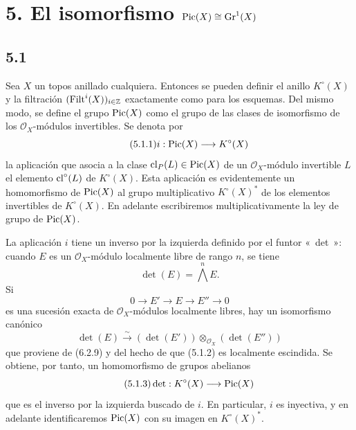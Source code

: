 
\section*{5. El isomorfismo \(\operatorname{Pic}(X)\cong\operatorname{Gr}^1(X)\)}

\subsection*{5.1}
Sea \(X\) un topos anillado cualquiera. Entonces se pueden definir el anillo \(K^\circ(X)\) y la filtración \((\operatorname{Filt}^i(X))_{i\in\mathbb Z}\) exactamente como para los esquemas. Del mismo modo, se define el grupo \(\operatorname{Pic}(X)\) como el grupo de las clases de isomorfismo de los \(\mathcal O_X\)-módulos invertibles. Se denota por
\begin{equation}\tag{5.1.1}
 i:\operatorname{Pic}(X)\longrightarrow K^\circ(X)
\end{equation}
la aplicación que asocia a la clase \(\operatorname{cl}_P(L)\in\operatorname{Pic}(X)\) de un \(\mathcal O_X\)-módulo invertible \(L\) el elemento \(\operatorname{cl}^\circ(L)\) de \(K^\circ(X)\). Esta aplicación es evidentemente un homomorfismo de \(\operatorname{Pic}(X)\) al grupo multiplicativo \(K^\circ(X)^*\) de los elementos invertibles de \(K^\circ(X)\). En adelante escribiremos multiplicativamente la ley de grupo de \(\operatorname{Pic}(X)\).

La aplicación \(i\) tiene un inverso por la izquierda definido por el funtor «~det~»: cuando \(E\) es un \(\mathcal O_X\)-módulo localmente libre de rango \(n\), se tiene
\[
 \det(E)=\bigwedge^n E.
\]
Si
\begin{equation}\tag{5.1.2}
0\longrightarrow E'\longrightarrow E\longrightarrow E''\longrightarrow0
\end{equation}
es una sucesión exacta de \(\mathcal O_X\)-módulos localmente libres, hay un isomorfismo canónico
\[
 \det(E)\xrightarrow{\sim}(\det(E'))\otimes_{\mathcal O_X}(\det(E''))
\]
que proviene de (6.2.9) y del hecho de que (5.1.2) es localmente escindida. Se obtiene, por tanto, un homomorfismo de grupos abelianos
\begin{equation}\tag{5.1.3}
 \det:K^\circ(X)\longrightarrow\operatorname{Pic}(X)
\end{equation}
que es el inverso por la izquierda buscado de \(i\). En particular, \(i\) es inyectiva, y en adelante identificaremos \(\operatorname{Pic}(X)\) con su imagen en \(K^\circ(X)^*\).

